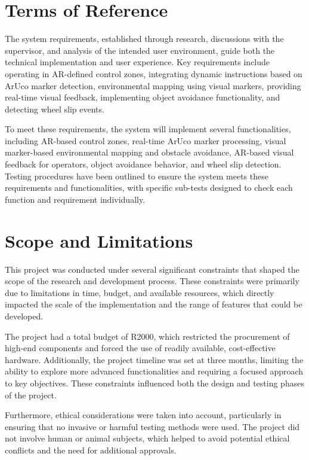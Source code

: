 \section{\label{sec:terms}Terms of Reference}

The system requirements, established through research, discussions with the supervisor, and analysis of the intended user environment, guide both the technical implementation and user experience. Key requirements include operating in AR-defined control zones, integrating dynamic instructions based on ArUco marker detection, environmental mapping using visual markers, providing real-time visual feedback, implementing object avoidance functionality, and detecting wheel slip events.

To meet these requirements, the system will implement several functionalities, including AR-based control zones, real-time ArUco marker processing, visual marker-based environmental mapping and obstacle avoidance, AR-based visual feedback for operators, object avoidance behavior, and wheel slip detection. Testing procedures have been outlined to ensure the system meets these requirements and functionalities, with specific sub-tests designed to check each function and requirement individually.


\section{\label{sec:scope}Scope and Limitations}

This project was conducted under several significant constraints that shaped the scope of the research and development process. These constraints were primarily due to limitations in time, budget, and available resources, which directly impacted the scale of the implementation and the range of features that could be developed.

The project had a total budget of R2000, which restricted the procurement of high-end components and forced the use of readily available, cost-effective hardware. Additionally, the project timeline was set at three months, limiting the ability to explore more advanced functionalities and requiring a focused approach to key objectives. These constraints influenced both the design and testing phases of the project.

Furthermore, ethical considerations were taken into account, particularly in ensuring that no invasive or harmful testing methods were used. The project did not involve human or animal subjects, which helped to avoid potential ethical conflicts and the need for additional approvals.


